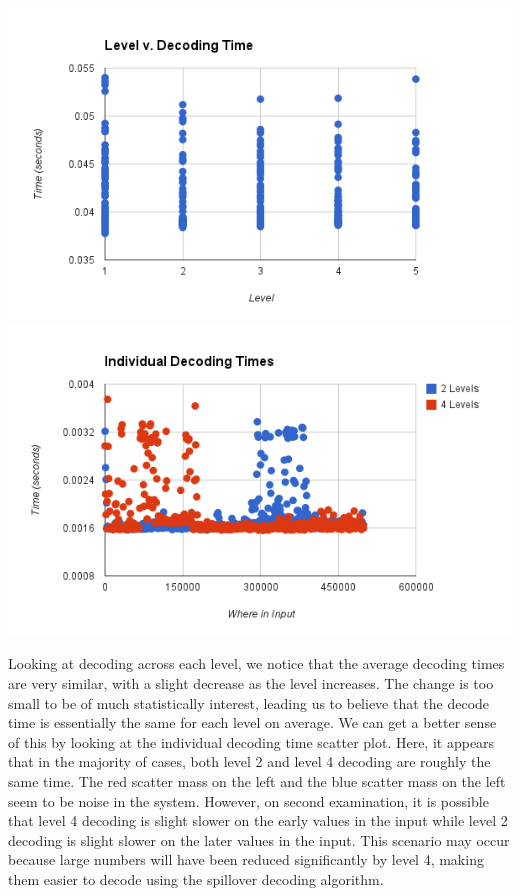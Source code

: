 \documentclass{article}
\begin{document}
\includegraphics[scale=0.4]{images/betterlevel_v_decode}
\includegraphics[scale=0.4]{images/individual_decodetime}
\afterpage{\vfill}

Looking at decoding across each level, we notice that the average decoding times are very similar, with a slight decrease as the level increases. The change is too small to be of much statistically interest, leading us to believe that the decode time is essentially the same for each level on average. We can get a better sense of this by looking at the individual decoding time scatter plot. Here, it appears that in the majority of cases, both level 2 and level 4 decoding are roughly the same time. The red scatter mass on the left and the blue scatter mass on the left seem to be noise in the system. However, on second examination, it is possible that level 4 decoding is slight slower on the early values in the input while level 2 decoding is slight slower on the later values in the input. This scenario may occur because large numbers will have been reduced significantly by level 4, making them easier to decode using the spillover decoding algorithm.\\
\end{document}
